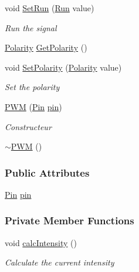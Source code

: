 \begin{DoxyCompactItemize}
\item 
void \hyperlink{class_hardware_1_1_p_w_m_a73b5f0047d4eb62f93f72745124fca73}{Set\+Run} (\hyperlink{class_hardware_1_1_p_w_m_a6f1e614731154a3613c03a4238ddd107}{Run} value)
\begin{DoxyCompactList}\small\item\em Run the signal \end{DoxyCompactList}\item 
\hyperlink{class_hardware_1_1_p_w_m_a728111433109229b4da1efc953a107c1}{Polarity} \hyperlink{class_hardware_1_1_p_w_m_a938dbb560c1dd057193b39a4186bef9c}{Get\+Polarity} ()
\item 
void \hyperlink{class_hardware_1_1_p_w_m_a2fc3f25039bd180daf3af186912c3a29}{Set\+Polarity} (\hyperlink{class_hardware_1_1_p_w_m_a728111433109229b4da1efc953a107c1}{Polarity} value)
\begin{DoxyCompactList}\small\item\em Set the polarity \end{DoxyCompactList}\item 
\hyperlink{class_hardware_1_1_p_w_m_ac5608137ddc798aa26c505ec6edb8458}{P\+W\+M} (\hyperlink{class_hardware_1_1_p_w_m_a7cc6acf1c28f0eaef16246635dc0353a}{Pin} \hyperlink{class_hardware_1_1_p_w_m_a47a155962c7c376bf1fe27c15c1e1e1d}{pin})
\begin{DoxyCompactList}\small\item\em Constructeur \end{DoxyCompactList}\item 
\hyperlink{class_hardware_1_1_p_w_m_a2867d5a260e3b6069926a3282e66ebba}{$\sim$\+P\+W\+M} ()
\end{DoxyCompactItemize}
\subsubsection*{Public Attributes}
\begin{DoxyCompactItemize}
\item 
\hyperlink{class_hardware_1_1_p_w_m_a7cc6acf1c28f0eaef16246635dc0353a}{Pin} \hyperlink{class_hardware_1_1_p_w_m_a47a155962c7c376bf1fe27c15c1e1e1d}{pin}
\end{DoxyCompactItemize}
\subsubsection*{Private Member Functions}
\begin{DoxyCompactItemize}
\item 
void \hyperlink{class_hardware_1_1_p_w_m_a891abdbbd00aae4f0a4afdf0a9e3a160}{calc\+Intensity} ()
\begin{DoxyCompactList}\small\item\em Calculate the current intensity \end{DoxyCompactList}\end{DoxyCompactItemize}
